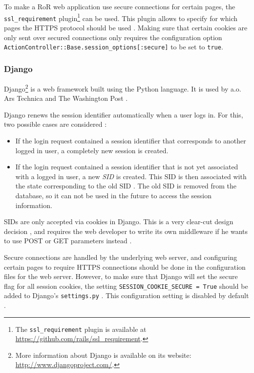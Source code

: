 To make a RoR web application use secure connections for certain pages, the \texttt{ssl\_requirement} plugin\footnote{The \texttt{ssl\_requirement} plugin is available at \url{https://github.com/rails/ssl_requirement}.} can be used. This plugin allows to specify for which pages the HTTPS protocol should be used \cite{Slater2008}. Making sure that certain cookies are only sent over secured connections only requires the configuration option \texttt{ActionController::Base.session\_options[:secure]} to be set to \texttt{true}.

\subsubsection{Django}

Django\footnote{More information about Django is available on its website: \url{http://www.djangoproject.com/}.} is a web framework built using the Python language. It is used by a.o. Ars Technica and The Washington Post \cite{DjangoPoweredBy}.

Django renews the session identifier automatically when a user logs in. For this, two possible cases are considered \cite{DjangoLoginCode}:
\begin{itemize}
	\item If the login request contained a session identifier that corresponds to another logged in user, a completely new session is created.
	\item If the login request contained a session identifier that is not yet associated with a logged in user, a new \emph{SID} is created. This SID is then associated with the state corresponding to the old SID \cite{DjangoSessionsCode}. The old SID is removed from the database, so it can not be used in the future to access the session information.
\end{itemize}

SIDs are only accepted via cookies in Django. This is a very clear-cut design decision \cite{DjangoSessions}, and requires the web developer to write its own middleware if he wants to use POST or GET parameters instead \cite{Fairs2007}.

Secure connections are handled by the underlying web server, and configuring certain pages to require HTTPS connections should be done in the configuration files for the web server. However, to make sure that Django will set the secure flag for all session cookies, the setting \texttt{SESSION\_COOKIE\_SECURE = True} should be added to Django's \texttt{settings.py} \cite{Barnham2009}. This configuration setting is disabled by default \cite{Holovaty2008}.

